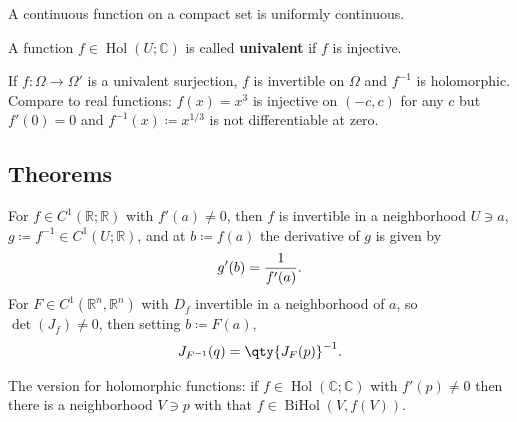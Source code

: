 \begin{remark}

A continuous function on a compact set is uniformly continuous.

\end{remark}

\begin{definition}

A function \(f\in \mathop{\mathrm{Hol}}(U; {\mathbb{C}})\) is called
\textbf{univalent} if \(f\) is injective.

\end{definition}

\begin{remark}

If \(f: \Omega \to \Omega'\) is a univalent surjection, \(f\) is
invertible on \(\Omega\) and \(f^{-1}\) is holomorphic. Compare to real
functions: \(f(x) = x^3\) is injective on \((-c, c)\) for any \(c\) but
\(f'(0) = 0\) and \(f^{-1}(x) \coloneqq x^{1/3}\) is not differentiable
at zero.

\end{remark}

\hypertarget{theorems}{%
\subsection{Theorems}\label{theorems}}

\begin{theorem}

\end{theorem}

\begin{theorem}

For \(f \in C^1({\mathbb{R}}; {\mathbb{R}})\) with \(f'(a) \neq 0\),
then \(f\) is invertible in a neighborhood \(U \ni a\),
\(g\coloneqq f^{-1}\in C^1(U; {\mathbb{R}})\), and at
\(b\coloneqq f(a)\) the derivative of \(g\) is given by
\begin{align*}
g'(b) = {1 \over f'(a)}
.\end{align*}
For \(F \in C^1({\mathbb{R}}^n, {\mathbb{R}}^n)\) with \(D_f\)
invertible in a neighborhood of \(a\), so \(\det(J_f)\neq 0\), then
setting \(b\coloneqq F(a)\),
\begin{align*}
J_{F^{-1}}(q) = \qty{J_F(p)}^{-1}
.\end{align*}

The version for holomorphic functions: if
\(f\in \mathop{\mathrm{Hol}}({\mathbb{C}}; {\mathbb{C}})\) with
\(f'(p)\neq 0\) then there is a neighborhood \(V\ni p\) with that
\(f\in \mathop{\mathrm{BiHol}}(V, f(V))\).

\end{theorem}


